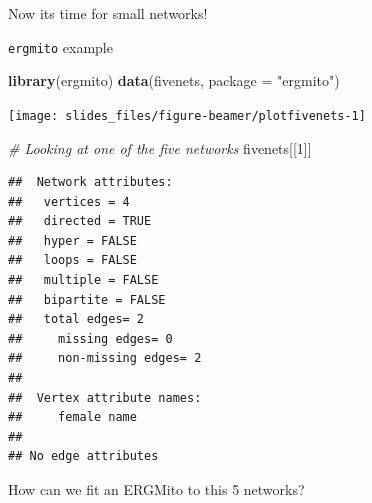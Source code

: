 \documentclass[10pt,ignorenonframetext,handout,aspectratio=169,]{beamer}
\newenvironment{Shaded}{\begin{snugshade}}{\end{snugshade}}
\newcommand{\CommentTok}[1]{\textcolor[rgb]{0.56,0.35,0.01}{\textit{#1}}}
\newcommand{\DataTypeTok}[1]{\textcolor[rgb]{0.13,0.29,0.53}{#1}}
\newcommand{\DecValTok}[1]{\textcolor[rgb]{0.00,0.00,0.81}{#1}}
\newcommand{\KeywordTok}[1]{\textcolor[rgb]{0.13,0.29,0.53}{\textbf{#1}}}
\newcommand{\NormalTok}[1]{#1}
\newcommand{\StringTok}[1]{\textcolor[rgb]{0.31,0.60,0.02}{#1}}
\begin{document}
\begin{frame}

Now its time for small networks!

\end{frame}

\begin{frame}[fragile]{\texttt{ergmito} example}
\protect\hypertarget{ergmito-example}{}

\footnotesize

\begin{Shaded}
\begin{Highlighting}[]
\KeywordTok{library}\NormalTok{(ergmito)}
\KeywordTok{data}\NormalTok{(fivenets, }\DataTypeTok{package =} \StringTok{"ergmito"}\NormalTok{)}
\end{Highlighting}
\end{Shaded}

\normalsize

\footnotesize

\begin{center}\texttt{[image: slides\_files/figure-beamer/plotfivenets-1]} \end{center}

\normalsize

\end{frame}

\begin{frame}[fragile]

\footnotesize

\begin{Shaded}
\begin{Highlighting}[]
\CommentTok{# Looking at one of the five networks}
\NormalTok{fivenets[[}\DecValTok{1}\NormalTok{]]}
\end{Highlighting}
\end{Shaded}

\begin{verbatim}
##  Network attributes:
##   vertices = 4 
##   directed = TRUE 
##   hyper = FALSE 
##   loops = FALSE 
##   multiple = FALSE 
##   bipartite = FALSE 
##   total edges= 2 
##     missing edges= 0 
##     non-missing edges= 2 
## 
##  Vertex attribute names: 
##     female name 
## 
## No edge attributes
\end{verbatim}

\normalsize

\pause How can we fit an ERGMito to this 5 networks?

\end{frame}
\end{document}
